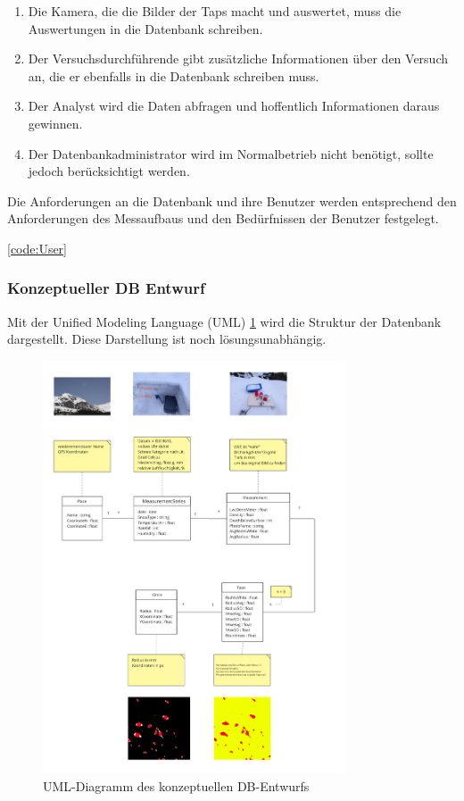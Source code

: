 \begin{enumerate}
\item Die Kamera, die die Bilder der Taps macht und auswertet, muss die Auswertungen in die Datenbank schreiben.
  \item Der Versuchsdurchführende gibt zusätzliche Informationen über den Versuch an, die er ebenfalls in die Datenbank schreiben muss.
    
    \item Der Analyst wird die Daten abfragen und hoffentlich Informationen daraus gewinnen.
    
    \item Der Datenbankadministrator wird im Normalbetrieb nicht benötigt, sollte jedoch berücksichtigt werden.
\end{enumerate}

Die Anforderungen an die Datenbank und ihre Benutzer werden entsprechend den Anforderungen des Messaufbaus und den Bedürfnissen der Benutzer festgelegt.

\ref{code:User}

\subsubsection{Konzeptueller DB Entwurf}

Mit der Unified Modeling Language (UML) \ref{fig:uml-db-entwurf}  wird die Struktur der Datenbank dargestellt. Diese Darstellung ist noch lösungsunabhängig.

\begin{figure}
    \centering
    \includegraphics[width=0.8\textwidth]{Bilder/Screenshotfrom2024-04-1418-05-35.png}
    \caption{UML-Diagramm des konzeptuellen DB-Entwurfs}
    \label{fig:uml-db-entwurf}
\end{figure}



